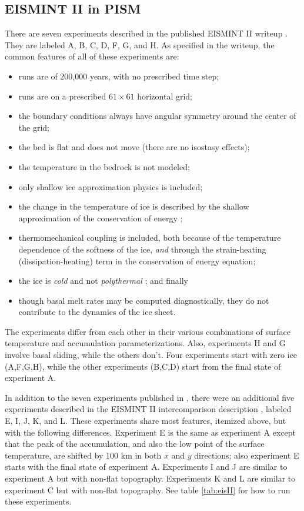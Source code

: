 \documentclass[11pt,final]{amsart}
\begin{document}
\subsection{EISMINT II in PISM}  There are seven experiments described in the published EISMINT II writeup \cite{EISMINT00}. They are labeled A, B, C, D, F, G, and H.  As specified in the writeup, the common features of all of these experiments are:\begin{itemize}
\item runs are of 200,000 years, with no prescribed time step;
\item runs are on a prescribed $61\times 61$ horizontal grid;
\item the boundary conditions always have angular symmetry around the center of the grid;
\item the bed is flat and does not move (there are no isostasy effects);
\item the temperature in the bedrock is not modeled;
\item only shallow ice approximation physics is included;
\item the change in the temperature of ice is described by the shallow approximation of the conservation of energy \cite{Fowler};
\item thermomechanical coupling is included, both because of the temperature dependence of the softness of the ice, \emph{and} through the strain-heating (dissipation-heating) term in the conservation of energy equation;
\item the ice is \emph{cold} and not \emph{polythermal} \cite{Greve}; and finally
\item though basal melt rates may be computed diagnostically, they do not contribute to the dynamics of the ice sheet.
\end{itemize}
The experiments differ from each other in their various combinations of surface temperature and accumulation parameterizations.  Also, experiments H and G involve basal sliding, while the others don't.  Four experiments start with zero ice (A,F,G,H), while the other experiments (B,C,D) start from the final state of experiment A.

In addition to the seven experiments published in \cite{EISMINT00}, there were an additional five experiments described in the EISMINT II intercomparison description 
\cite{EISIIdescribe}, labeled E, I, J, K, and L.  These experiments share most features, itemized above, but with the following differences.  Experiment E is the same as experiment A except that the peak of the accumulation, and also the low point of the surface temperature, are shifted by 100 km in both $x$ and $y$ directions; also experiment E starts with the final state of experiment A.  Experiments I and J are similar to experiment A but with non-flat topography.  Experiments K and L are similar to experiment C but with non-flat topography.  See table \ref{tab:eisII} for how to run these experiments.
\end{document}
